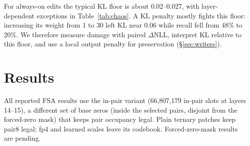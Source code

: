\documentclass[11pt]{article}
\begin{document}
For always-on edits the typical KL floor is about 0.02--0.027, with layer-dependent exceptions in
Table~\ref{tab:chaos}. A KL penalty mostly fights this floor: increasing its weight from 1 to 30 left
KL near 0.06 while recall fell from 48\% to 20\%. We therefore measure damage with paired $\Delta$NLL,
interpret KL relative to this floor, and use a local output penalty for preservation (\S\ref{sec:writers}).

\section{Results}
\label{sec:results}
All reported FSA results use the in-pair variant (66,807,179 in-pair slots at layers 14--15),
a different set of base zeros (inside the selected pairs, disjoint from the forced-zero mask) that keeps pair occupancy legal. Plain ternary patches
keep pair8 legal; fp4 and learned scales leave its codebook. Forced-zero-mask results are pending.
\end{document}
